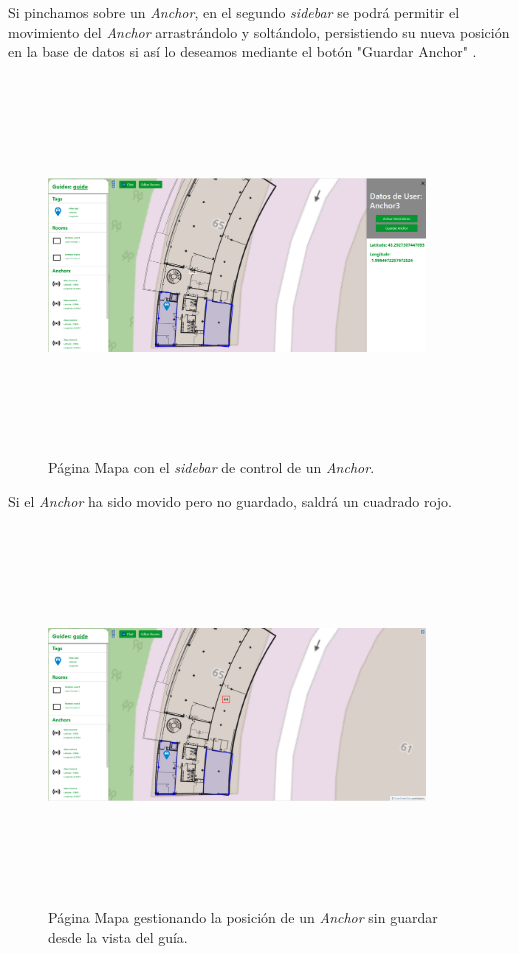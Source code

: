 Si pinchamos sobre un \textit{Anchor}, en el segundo \textit{sidebar} se podrá permitir el movimiento del \textit{Anchor} arrastrándolo y soltándolo, persistiendo su nueva posición en la base de datos si así lo deseamos mediante el botón "Guardar Anchor" . 
\FloatBarrier
\begin{figure}[h]
    \centering
    \includegraphics[width=10cm,height=10cm,keepaspectratio]{img/anchorsidebar.png}
    \caption{Página Mapa con el \textit{sidebar} de control de un \textit{Anchor}.}
    \label{fig:Página Mapa con el sidebar de control de un Anchor}
\end{figure}
\FloatBarrier
Si el \textit{Anchor} ha sido movido pero no guardado, saldrá un cuadrado rojo.
\FloatBarrier
\begin{figure}[h]
    \centering
    \includegraphics[width=10cm,height=10cm,keepaspectratio]{img/anchorsidebarMoved.png}
    \caption{Página Mapa gestionando la posición de un \textit{Anchor} sin guardar desde la vista del guía.}
    \label{fig:Página Mapa gestionando la posición de un Anchor sin guardar desde la vista del guía}
\end{figure}
\FloatBarrier

